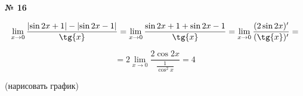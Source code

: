 \documentclass{article}
\begin{document}
\textbf{№ 16} 
\large

$$ \lim\limits_{x \to 0} \frac{\left| \sin{2x} + 1 \right| - \left| \sin{2x} - 1 \right|}{\tg{x}} 
= \lim\limits_{x \to 0} \frac{\sin{2x} + 1  +  \sin{2x} - 1 }{\tg{x}}
= \lim\limits_{x \to 0} \frac{(2\sin{2x})'}{(\tg{x})'}
= $$  

$$ = 2 \lim\limits_{x \to 0} \frac{2\cos{2x}}{\frac{1}{\cos^2{x}}}
= 4 $$

(нарисовать график)
\end{document}
